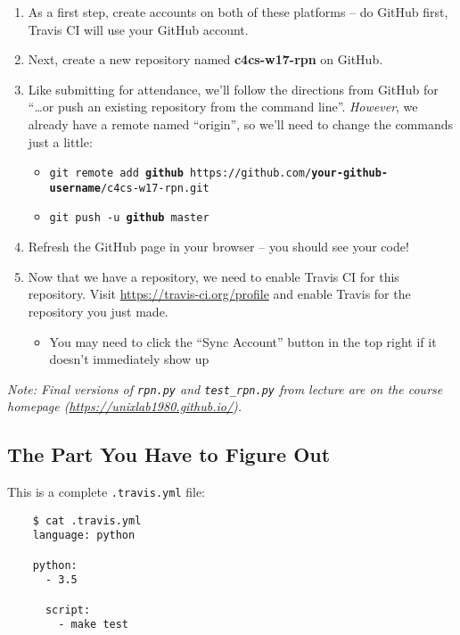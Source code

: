 \documentclass{article}
\begin{document}
\begin{enumerate}
  \item As a first step, create accounts on both of these platforms -- do
    GitHub first, Travis CI will use your GitHub account.
  \item Next, create a new repository named \textbf{c4cs-w17-rpn} on GitHub.
  \item Like submitting for attendance, we'll follow the directions from
    GitHub for ``\dots{}or push an existing repository from the command
    line''. \emph{However}, we already have a remote named ``origin'', so
    we'll need to change the commands just a little:
    \begin{itemize}
      \item \texttt{git remote add \textbf{github} https://github.com/\textbf{your-github-username}/c4cs-w17-rpn.git}
      \item \texttt{git push -u \textbf{github} master}
    \end{itemize}
  \item Refresh the GitHub page in your browser -- you should see your code!
  \item Now that we have a repository, we need to enable Travis CI for this
    repository. Visit \url{https://travis-ci.org/profile} and enable Travis
    for the repository you just made.
    \begin{itemize}
      \item You may need to click the ``Sync Account'' button in the top
        right if it doesn't immediately show up
    \end{itemize}
\end{enumerate}

\emph{Note: Final versions of \texttt{rpn.py} and \texttt{test\_rpn.py} from
  lecture are on the course homepage (\url{https://unixlab1980.github.io/}).}

\newpage

\subsection{The Part You Have to Figure Out}

{\color{violet}
  This is a complete \texttt{.travis.yml} file:

  \begin{lstlisting}
    $ cat .travis.yml
    language: python

    python:
      - 3.5

      script:
        - make test
  \end{lstlisting}
}
\end{document}
